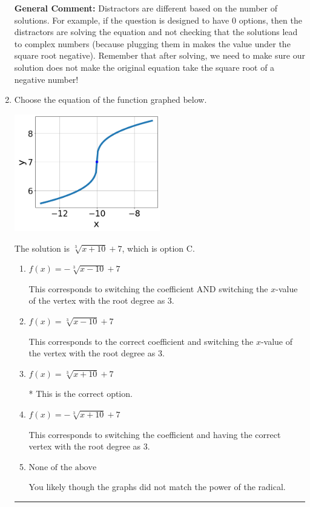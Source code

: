 \documentclass{extbook}[14pt]
\newcommand{\litem}[1]{\item #1

\rule{\textwidth}{0.4pt}}
\begin{document}
\begin{enumerate}
{\textbf{General Comment:} Distractors are different based on the number of solutions. For example, if the question is designed to have 0 options, then the distractors are solving the equation and not checking that the solutions lead to complex numbers (because plugging them in makes the value under the square root negative). Remember that after solving, we need to make sure our solution does not make the original equation take the square root of a negative number!
}
\litem{
Choose the equation of the function graphed below.

\begin{center}
    \includegraphics[width=0.5\textwidth]{../Figures/radicalGraphToEquationC.png}
\end{center}


The solution is \( \sqrt[3]{x + 10} + 7 \), which is option C.\begin{enumerate}[label=\Alph*.]
\item \( f(x) = - \sqrt[3]{x - 10} + 7 \)

This corresponds to switching the coefficient AND switching the $x$-value of the vertex with the root degree as $3$.
\item \( f(x) = \sqrt[3]{x - 10} + 7 \)

This corresponds to the correct coefficient and switching the $x$-value of the vertex with the root degree as $3$.
\item \( f(x) = \sqrt[3]{x + 10} + 7 \)

* This is the correct option.
\item \( f(x) = - \sqrt[3]{x + 10} + 7 \)

This corresponds to switching the coefficient and having the correct vertex with the root degree as $3$.
\item \( \text{None of the above} \)

You likely though the graphs did not match the power of the radical.
\end{enumerate}

}
\end{enumerate}
\end{document}
